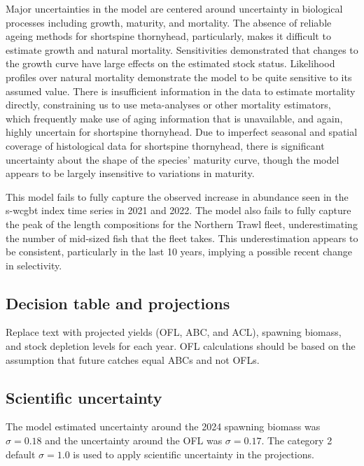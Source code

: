 \documentclass[11pt,
  english,
  letterpaper,
]{article}
\begin{document}
Major uncertainties in the model are centered around uncertainty in biological processes including growth, maturity, and mortality. The absence of reliable ageing methods for shortspine thornyhead, particularly, makes it difficult to estimate growth and natural mortality. Sensitivities demonstrated that changes to the growth curve have large effects on the estimated stock status. Likelihood profiles over natural mortality demonstrate the model to be quite sensitive to its assumed value. There is insufficient information in the data to estimate mortality directly, constraining us to use meta-analyses or other mortality estimators, which frequently make use of aging information that is unavailable, and again, highly uncertain for shortspine thornyhead. Due to imperfect seasonal and spatial coverage of histological data for shortspine thornyhead, there is significant uncertainty about the shape of the species' maturity curve, though the model appears to be largely insensitive to variations in maturity.

This model fails to fully capture the observed increase in abundance seen in the \gls{s-wcgbt} index time series in 2021 and 2022. The model also fails to fully capture the peak of the length compositions for the Northern Trawl fleet, underestimating the number of mid-sized fish that the fleet takes. This underestimation appears to be consistent, particularly in the last 10 years, implying a possible recent change in selectivity.

\hypertarget{decision-table-and-projections}{%
\subsection*{Decision table and projections}\label{decision-table-and-projections}}

Replace text with projected yields (OFL, ABC, and ACL), spawning biomass, and stock depletion levels for each year. OFL calculations should be based on the assumption that future catches equal ABCs and not OFLs.

\hypertarget{scientific-uncertainty}{%
\subsection*{Scientific uncertainty}\label{scientific-uncertainty}}

The model estimated uncertainty around the 2024 spawning biomass was \(\sigma= 0.18\) and the uncertainty around the OFL was \(\sigma = 0.17\). The category 2 default \(\sigma = 1.0\) is used to apply scientific uncertainty in the projections.
\end{document}
